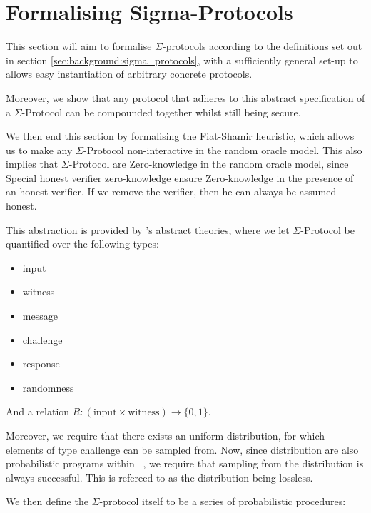 \chapter{Formalising Sigma-Protocols}
\label{ch:formal_sigma}
This section will aim to formalise $\Sigma$-protocols according to the
definitions set out in section \ref{sec:background:sigma_protocols}, with a
sufficiently general set-up to allows easy instantiation of arbitrary concrete
protocols.

Moreover, we show that any protocol that adheres to this abstract specification
of a $\Sigma$-Protocol can be compounded together whilst still being secure.

We then end this section by formalising the Fiat-Shamir heuristic, which allows
us to make any $\Sigma$-Protocol non-interactive in the random oracle model.
This also implies that $\Sigma$-Protocol are Zero-knowledge in the random oracle
model, since Special honest verifier zero-knowledge ensure Zero-knowledge in the
presence of an honest verifier. If we remove the verifier, then he can always be
assumed honest.


This abstraction is provided by \easycrypt's abstract theories, where we let
$\Sigma$-Protocol be quantified over the following types:
\begin{itemize}
  \item input
  \item witness
  \item message
  \item challenge
  \item response
  \item randomness
\end{itemize}

And a relation $R : (\text{input} \times \text{witness}) \rightarrow \{0,1\}$.

Moreover, we require that there exists an uniform distribution, for which
elements of type challenge can be sampled from. Now, since distribution are also
probabilistic programs within \easycrypt\ , we require that sampling from the
distribution is always successful. This is refereed to as the distribution being lossless.


We then define the $\Sigma$-protocol itself to be a series of probabilistic procedures:



